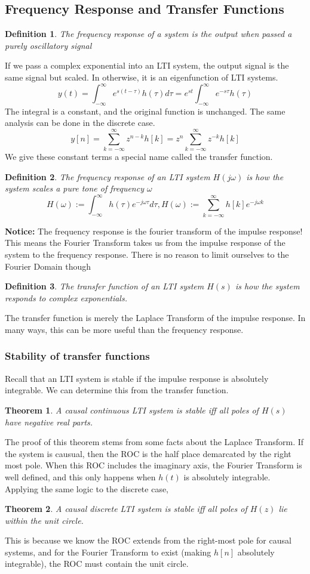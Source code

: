 \documentclass{article}
\newtheorem{theorem}{Theorem}
\newtheorem{definition}{Definition}
\begin{document}
\subsection{Frequency Response and Transfer Functions}
\begin{definition}
    The frequency response of a system is the output when passed a purely oscillatory signal
\end{definition}
If we pass a complex exponential into an LTI system, the output signal is the same signal but scaled.
In otherwise, it is an eigenfunction of LTI systems.
$$y(t)=\int_{-\infty}^{\infty}{e^{s(t-\tau)}h(\tau)d\tau}=e^{st}\int_{-\infty}^{\infty}{e^{-s\tau}h(\tau)}$$
The integral is a constant, and the original function is unchanged.
The same analysis can be done in the discrete case.
$$y[n]=\sum_{k=-\infty}^{\infty}z^{n-k}h[k] = z^n \sum_{k=-\infty}^{\infty}z^{-k}h[k]$$
We give these constant terms a special name called the transfer function.
\begin{definition}
    The frequency response of an LTI system $H(j\omega)$ is how the system scales a pure tone of frequency $\omega$
    $$H(\omega):=\int_{-\infty}^{\infty}{h(\tau)e^{-j\omega\tau}d\tau}, H(\omega):= \sum_{k=-\infty}^{\infty}{h[k]e^{-j\omega k}}$$
\end{definition}
\textbf{Notice: }The frequency response is the fourier transform of the impulse response!
This means the Fourier Transform takes us from the impulse response of the system to the frequency response.
There is no reason to limit ourselves to the Fourier Domain though
\begin{definition}
    The transfer function of an LTI system $H(s)$ is how the system responds to complex exponentials.
\end{definition}
The transfer function is merely the Laplace Transform of the impulse response. In many ways, this can be more useful than the frequency response.
\subsubsection{Stability of transfer functions}
Recall that an LTI system is stable if the impulse response is absolutely integrable. We can determine this from the transfer function.
\begin{theorem}
    A causal continuous LTI system is stable iff all poles of $H(s)$ have negative real parts.
\end{theorem}

The proof of this theorem stems from some facts about the Laplace Transform. If the system is causual, then the ROC is the half place demarcated by the right most pole.
When this ROC includes the imaginary axis, the Fourier Transform is well defined, and this only happens when $h(t)$ is absolutely integrable.
Applying the same logic to the discrete case,
\begin{theorem}
    A causal discrete LTI system is stable iff all poles of $H(z)$ lie within the unit circle.
\end{theorem}
This is because we know the ROC extends from the right-most pole for causal systems, and for the Fourier Transform to exist (making $h[n]$ absolutely integrable), the ROC must contain the unit circle.
\end{document}
